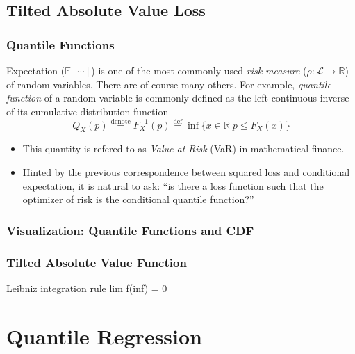 \documentclass{beamer}
\begin{document}

\subsection{Tilted Absolute Value Loss}

\begin{frame}
\frametitle{Quantile Functions}

Expectation ($\mathbb{E}[\cdots]$) is one of the most commonly used \textit{risk measure} ($\rho: \mathcal{L} \rightarrow \mathbb{R}$) of random variables. There are of course many others. For example, \alert{\textit{quantile function}} of a random variable is commonly defined as the left-continuous inverse of its cumulative distribution function
$$
Q_{X}(p) \stackrel{\text{denote}}{=} F^{-1}_X(p) \stackrel{\text{def}}{=}
\inf \{ x \in \mathbb{R} | p \leq F_X(x) \}
$$

\begin{itemize}
    \item This quantity is refered to as \textit{Value-at-Risk} (VaR) in mathematical finance.
    \item Hinted by the previous correspondence between squared loss and conditional expectation, it is natural to ask: ``is there a loss function such that the optimizer of risk is the conditional quantile function?''
\end{itemize}

\end{frame}


\begin{frame}
\frametitle{Visualization: Quantile Functions and CDF}

\end{frame}


\begin{frame}
\frametitle{Tilted Absolute Value Function}

Leibniz integration rule
lim f(inf) = 0

\end{frame}


\section{Quantile Regression}
\end{document}
